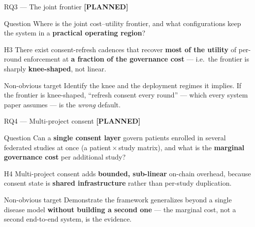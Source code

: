 \documentclass[aspectratio=169, 11pt]{beamer}
\newcommand{\plannedlight}{{\color{mLight}\textbf{[PLANNED]}}}
\begin{document}
\begin{frame}{RQ3 --- The joint frontier \hfill \plannedlight}
\begin{block}{Question}
Where is the joint cost--utility frontier, and what configurations keep the
system in a \textbf{practical operating region}?
\end{block}
\begin{alertblock}{H3}
There exist consent-refresh cadences that recover \textbf{most of the utility}
of per-round enforcement at \textbf{a fraction of the governance cost} ---
i.e.\ the frontier is sharply \textbf{knee-shaped}, not linear.
\end{alertblock}
\begin{exampleblock}{Non-obvious target}
Identify the knee and the deployment regimes it implies. If the frontier is
knee-shaped, ``refresh consent every round'' --- which every system paper
assumes --- is the \emph{wrong} default.
\end{exampleblock}
\end{frame}

\begin{frame}{RQ4 --- Multi-project consent \hfill \plannedlight}
\begin{block}{Question}
Can a \textbf{single consent layer} govern patients enrolled in several
federated studies at once (a patient\,$\times$\,study matrix), and what is the
\textbf{marginal governance cost} per additional study?
\end{block}
\begin{alertblock}{H4}
Multi-project consent adds \textbf{bounded, sub-linear} on-chain overhead,
because consent state is \textbf{shared infrastructure} rather than
per-study duplication.
\end{alertblock}
\begin{exampleblock}{Non-obvious target}
Demonstrate the framework generalizes beyond a single disease model
\textbf{without building a second one} --- the marginal cost, not a second
end-to-end system, is the evidence.
\end{exampleblock}
\end{frame}
\end{document}
